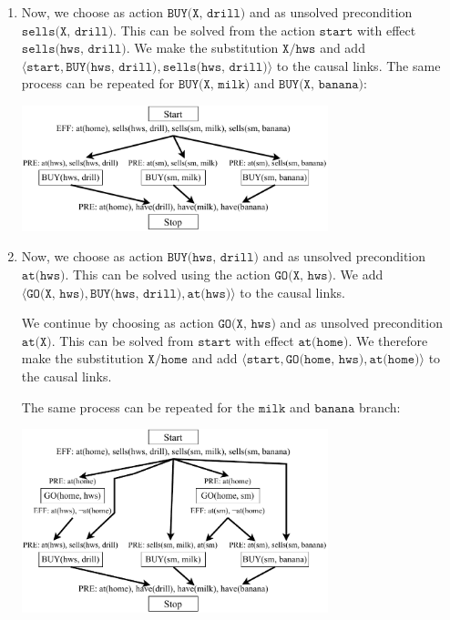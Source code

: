 \begin{example}
\begin{enumerate}
        \item Now, we choose as action $\texttt{BUY(X, drill)}$ and as unsolved precondition $\texttt{sells(X, drill)}$.
            This can be solved from the action $\texttt{start}$ with effect $\texttt{sells(hws, drill)}$.
            We make the substitution $\texttt{X}/\texttt{hws}$ and 
            add $\langle \texttt{start}, \texttt{BUY(hws, drill)}, \texttt{sells(hws, drill)} \rangle$ to the causal links.
            The same process can be repeated for $\texttt{BUY(X, milk)}$ and $\texttt{BUY(X, banana)}$:
            \begin{center}
                \includegraphics[width=0.7\textwidth]{img/_pop_example4.pdf}
            \end{center}

        \item Now, we choose as action $\texttt{BUY(hws, drill)}$ and as unsolved precondition $\texttt{at(hws)}$.
            This can be solved using the action $\texttt{GO(X, hws)}$.
            We add $\langle \texttt{GO(X, hws)}, \texttt{BUY(hws, drill)}, \texttt{at(hws)} \rangle$ to the causal links.

            We continue by choosing as action $\texttt{GO(X, hws)}$ and as unsolved precondition $\texttt{at(X)}$.
            This can be solved from $\texttt{start}$ with effect $\texttt{at(home)}$.
            We therefore make the substitution $\texttt{X}/\texttt{home}$ and 
            add $\langle \texttt{start}, \texttt{GO(home, hws)}, \texttt{at(home)} \rangle$ to the causal links.

            The same process can be repeated for the $\texttt{milk}$ and $\texttt{banana}$ branch:
            \begin{center}
                \includegraphics[width=0.7\textwidth]{img/_pop_example5.pdf}
            \end{center}


\end{enumerate}
\end{example}
